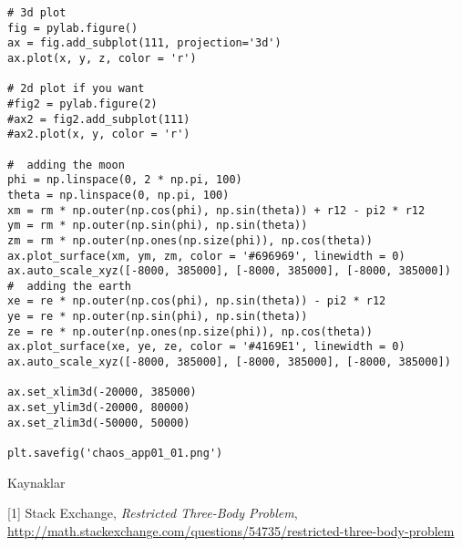 \documentclass[12pt,fleqn]{article}\usepackage{../../common}
\begin{document}
\begin{verbatim}
# 3d plot
fig = pylab.figure()
ax = fig.add_subplot(111, projection='3d')
ax.plot(x, y, z, color = 'r')

# 2d plot if you want
#fig2 = pylab.figure(2)
#ax2 = fig2.add_subplot(111)
#ax2.plot(x, y, color = 'r')

#  adding the moon
phi = np.linspace(0, 2 * np.pi, 100)
theta = np.linspace(0, np.pi, 100)
xm = rm * np.outer(np.cos(phi), np.sin(theta)) + r12 - pi2 * r12
ym = rm * np.outer(np.sin(phi), np.sin(theta))
zm = rm * np.outer(np.ones(np.size(phi)), np.cos(theta))
ax.plot_surface(xm, ym, zm, color = '#696969', linewidth = 0)
ax.auto_scale_xyz([-8000, 385000], [-8000, 385000], [-8000, 385000])
#  adding the earth
xe = re * np.outer(np.cos(phi), np.sin(theta)) - pi2 * r12
ye = re * np.outer(np.sin(phi), np.sin(theta))
ze = re * np.outer(np.ones(np.size(phi)), np.cos(theta))
ax.plot_surface(xe, ye, ze, color = '#4169E1', linewidth = 0)
ax.auto_scale_xyz([-8000, 385000], [-8000, 385000], [-8000, 385000])

ax.set_xlim3d(-20000, 385000)
ax.set_ylim3d(-20000, 80000)
ax.set_zlim3d(-50000, 50000)

plt.savefig('chaos_app01_01.png')
\end{verbatim}









Kaynaklar

[1] Stack Exchange, {\em Restricted Three-Body Problem}, \url{http://math.stackexchange.com/questions/54735/restricted-three-body-problem}
\end{document}
